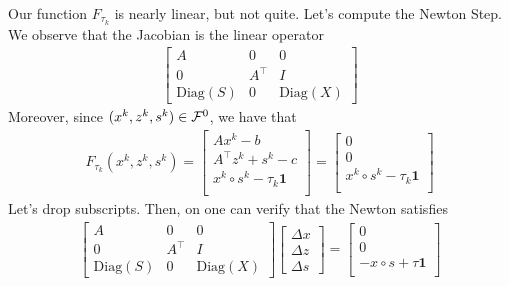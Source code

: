 	Our function $F_{\tau_k}$ is nearly linear, but not quite. Let's compute the Newton Step. We observe that the Jacobian is the linear operator
	\begin{eqnarray}
	\begin{bmatrix}
	A & 0 & 0 \\
	0 & A^\top & I \\
	\mathrm{Diag}(S) & 0 & \mathrm{Diag}(X)
	\end{bmatrix}
	\end{eqnarray}
	Moreover, since $(x^k,z^k,s^k) \in {\cal F}^0$, we have that
	\begin{eqnarray}
	F_{\tau_k}(x^k,z^k,s^k) = \begin{bmatrix} Ax^k - b \\
		A^\top z^k + s^k - c \\
		x^k \circ s^k - \tau_{k} \mathbf{1} \\
		\end{bmatrix} = \begin{bmatrix} 0 \\
		0 \\
		x^k \circ s^k - \tau_{k} \mathbf{1} \\
		\end{bmatrix}
	\end{eqnarray}
	Let's drop subscripts. Then, on one can verify that the Newton satisfies
	\begin{eqnarray}
	\begin{bmatrix}
	A & 0 & 0 \\
	0 & A^\top & I \\
	\mathrm{Diag}(S) & 0 & \mathrm{Diag}(X)
	\end{bmatrix} \begin{bmatrix} \Delta x\\
	\Delta z\\
	\Delta s
	\end{bmatrix} = \begin{bmatrix} 0 \\
	0 \\
	- x \circ s + \tau \mathbf{1} \\
	\end{bmatrix}
	\end{eqnarray}

